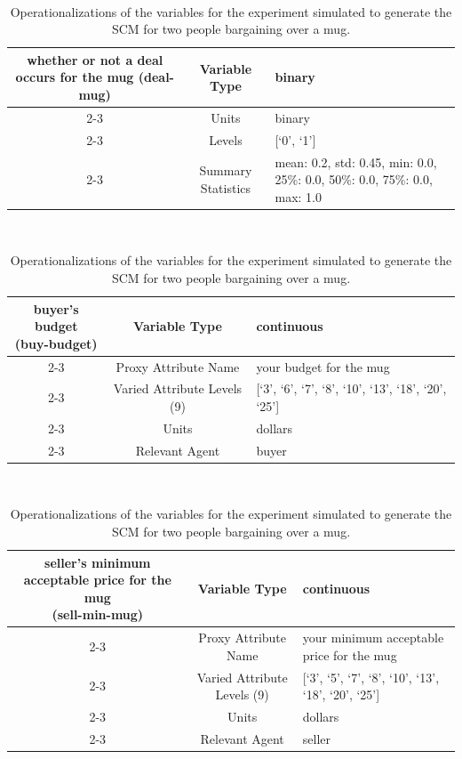 \documentclass[12pt]{article}
\begin{document}
\begin{table}[ht]
\centering
\caption{Operationalizations of the variables for the experiment simulated to generate the SCM for two people bargaining over a mug.}
\

\begin{tabularx}{\textwidth}{|c|c|X|}
\hline

\multirow{4}{*}{\parbox{5cm} { \centering whether or not a deal occurs for the mug (deal-mug)}} & Variable Type & binary  \\ \cline{2-3}
                        &  Units   &  binary   \\ \cline{2-3}
                        & Levels & [`0', `1'] \\ \cline{2-3}
                        & Summary Statistics   & mean: 0.2, std: 0.45, min: 0.0, 25\%: 0.0, 50\%: 0.0, 75\%: 0.0, max: 1.0    \\ \hline
\end{tabularx}\\
                


\begin{tabularx}{\textwidth}{|c|c|X|}
\hline
\multirow{5}{*}{\parbox{5cm} { \centering buyer's budget \\(buy-budget)}} & Variable Type & continuous  \\ \cline{2-3}
                        & Proxy Attribute Name   & your budget for the mug   \\ \cline{2-3}
                        & Varied Attribute Levels (9)  & [`3', `6', `7', `8', `10', `13', `18', `20', `25']   \\ \cline{2-3}
                        & Units  & dollars   \\ \cline{2-3}
                        & Relevant Agent   & buyer   \\ \hline
\end{tabularx}\\


\begin{tabularx}{\textwidth}{|c|c|X|}
\hline
\multirow{5}{*}{\parbox{5cm} { \centering seller's minimum acceptable price for the mug \\(sell-min-mug)}} & Variable Type & continuous  \\ \cline{2-3}
                        & Proxy Attribute Name   & your minimum acceptable price for the mug   \\ \cline{2-3}
                        & Varied Attribute Levels (9)  & [`3', `5', `7', `8', `10', `13', `18', `20', `25']   \\ \cline{2-3}
                        & Units  & dollars   \\ \cline{2-3}
                        & Relevant Agent   & seller   \\ \hline
\end{tabularx}\\



\end{table}
\end{document}
